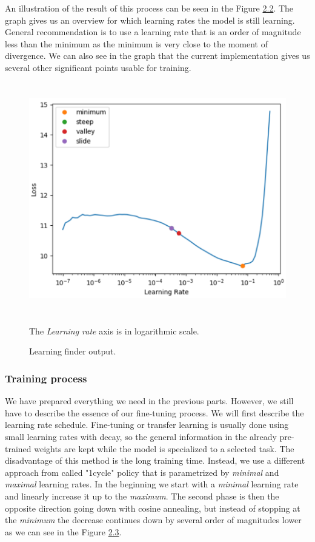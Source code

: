 An illustration of the result of this process can be seen in the Figure \hyperref[fig02:lrFinder]{2.2}. The graph gives us an overview for which learning rates the model is still learning. General recommendation is to use a learning rate that is an order of magnitude less than the minimum as the minimum is very close to the moment of divergence. We can also see in the graph that the current implementation gives us several other significant points usable for training.

\begin{figure}[h]\centering
\includegraphics[width=130mm, height=101mm]{../img/lrFinder}
\caption{Learning finder output.}
\label{fig02:lrFinder}
The \textit{Learning rate} axis is in logarithmic scale.
\end{figure}

\subsubsection*{Training process}
We have prepared everything we need in the previous parts. However, we still have to describe the essence of our fine-tuning process. We will first describe the learning rate schedule. Fine-tuning or transfer learning is usually done using small learning rates with decay, so the general information in the already pre-trained weights are kept while the model is specialized to a selected task. The disadvantage of this method is the long training time. Instead, we use a different approach from \citet{smith2018disciplined} called "1cycle" policy that is parametrized by \textit{minimal} and \textit{maximal} learning rates. In the beginning we start with a \textit{minimal} learning rate and linearly increase it up to the \textit{maximum}. The second phase is then the opposite direction going down with cosine annealing, but instead of stopping at the \textit{minimum} the decrease continues down by several order of magnitudes lower as we can see in the Figure \hyperref[fig03:lrSchedule]{2.3}. \\

